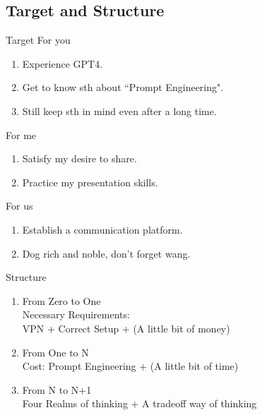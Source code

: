 \documentclass[UTF8, 16pt]{beamer}
\begin{document}
\begin{CJK*}{UTF8}{gbsn}
\section{Target and Structure}
\begin{frame}{Target}
	For you
	\begin{enumerate}
		\item Experience \alert{GPT4}.
		\item Get to know sth about \alert{``Prompt Engineering"}.
		\item Still keep sth in mind \alert{even after a long time}.
	\end{enumerate}
	For me
	\begin{enumerate}
		\item Satisfy my desire to \alert{share}.
		\item Practice my \alert{presentation skills}.
	\end{enumerate}
	For us
	\begin{enumerate}
		\item Establish a communication \alert{platform}.
		\item Dog rich and noble, don't forget wang.
	\end{enumerate}
\end{frame}
\begin{frame}{Structure}
	\begin{enumerate}
		\item From Zero to One 
			\\
			Necessary Requirements:
			\\
			\alert{VPN} + Correct Setup + (A little bit of money)
		\item From One to N
			\\
			Cost: \alert{Prompt Engineering} + (A little bit of time)
		\item From N to N+1
			\\
			\alert{Four Realms} of thinking + A \alert{tradeoff} way of thinking
	\end{enumerate}
\end{frame}


\end{CJK*}
\end{document}
